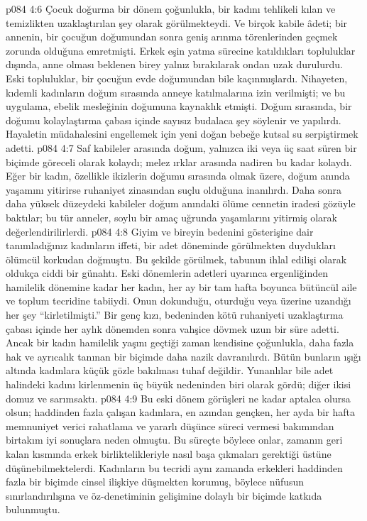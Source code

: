 \vs p084 4:6 Çocuk doğurma bir dönem çoğunlukla, bir kadını tehlikeli kılan ve temizlikten uzaklaştırılan şey olarak görülmekteydi. Ve birçok kabile âdeti; bir annenin, bir çocuğun doğumundan sonra geniş arınma törenlerinden geçmek zorunda olduğuna emretmişti. Erkek eşin yatma sürecine katıldıkları topluluklar dışında, anne olması beklenen birey yalnız bırakılarak ondan uzak durulurdu. Eski topluluklar, bir çocuğun evde doğumundan bile kaçınmışlardı. Nihayeten, kıdemli kadınların doğum sırasında anneye katılmalarına izin verilmişti; ve bu uygulama, ebelik mesleğinin doğumuna kaynaklık etmişti. Doğum sırasında, bir doğumu kolaylaştırma çabası içinde sayısız budalaca şey söylenir ve yapılırdı. Hayaletin müdahalesini engellemek için yeni doğan bebeğe kutsal su serpiştirmek adetti.
\vs p084 4:7 Saf kabileler arasında doğum, yalnızca iki veya üç saat süren bir biçimde göreceli olarak kolaydı; melez ırklar arasında nadiren bu kadar kolaydı. Eğer bir kadın, özellikle ikizlerin doğumu sırasında olmak üzere, doğum anında yaşamını yitirirse ruhaniyet zinasından suçlu olduğuna inanılırdı. Daha sonra daha yüksek düzeydeki kabileler doğum anındaki ölüme cennetin iradesi gözüyle baktılar; bu tür anneler, soylu bir amaç uğrunda yaşamlarını yitirmiş olarak değerlendirilirlerdi.
\vs p084 4:8 Giyim ve bireyin bedenini gösterişine dair tanımladığınız kadınların iffeti, bir adet döneminde görülmekten duydukları ölümcül korkudan doğmuştu. Bu şekilde görülmek, tabunun ihlal edilişi olarak oldukça ciddi bir günahtı. Eski dönemlerin adetleri uyarınca ergenliğinden hamilelik dönemine kadar her kadın, her ay bir tam hafta boyunca bütüncül aile ve toplum tecridine tabiiydi. Onun dokunduğu, oturduğu veya üzerine uzandığı her şey “kirletilmişti.” Bir genç kızı, bedeninden kötü ruhaniyeti uzaklaştırma çabası içinde her aylık dönemden sonra vahşice dövmek uzun bir süre adetti. Ancak bir kadın hamilelik yaşını geçtiği zaman kendisine çoğunlukla, daha fazla hak ve ayrıcalık tanınan bir biçimde daha nazik davranılırdı. Bütün bunların ışığı altında kadınlara küçük gözle bakılması tuhaf değildir. Yunanlılar bile adet halindeki kadını kirlenmenin üç büyük nedeninden biri olarak gördü; diğer ikisi domuz ve sarımsaktı.
\vs p084 4:9 Bu eski dönem görüşleri ne kadar aptalca olursa olsun; haddinden fazla çalışan kadınlara, en azından gençken, her ayda bir hafta memnuniyet verici rahatlama ve yararlı düşünce süreci vermesi bakımından birtakım iyi sonuçlara neden olmuştu. Bu süreçte böylece onlar, zamanın geri kalan kısmında erkek birliktelikleriyle nasıl başa çıkmaları gerektiği üstüne düşünebilmektelerdi. Kadınların bu tecridi aynı zamanda erkekleri haddinden fazla bir biçimde cinsel ilişkiye düşmekten korumuş, böylece nüfusun sınırlandırılışına ve öz\hyp{}denetiminin gelişimine dolaylı bir biçimde katkıda bulunmuştu.
